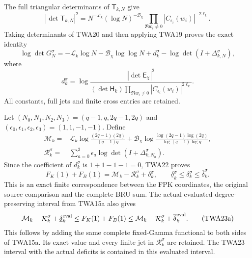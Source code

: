 \documentclass[11pt,a4paper]{article}
\begin{document}
The full triangular determinants of $\mathsf T_{k,N}$ give
\[
|\det\mathsf T_{k,N}|^2
=N^{-\mathcal L_k}(\log N)^{-\mathcal B_\chi}
 \prod_{\Re w_i\ne0}|C_{\epsilon_i}(w_i)|^{-2\ell_k}.
\]
Taking determinants of TWA20 and then applying TWA19 proves
the exact identity
\[
\log\det G_N^\sigma
=-\mathcal L_k\log N-\mathcal B_\chi\log\log N
 +d_k^\sigma-\log\det(I+\Delta_{k,N}^\sigma),
\tag{TWA22}
\]
where
\[
d_k^\sigma=\log\frac{|\det\mathsf E_\chi|^2}
{(\det\mathsf H_k)
 \prod_{\Re w_i\ne0}|C_{\epsilon_i}(w_i)|^{2\ell_k}}.
\]
All constants, full jets and finite cross entries are retained.

Let $(N_0,N_1,N_2,N_3)=(q-1,q,2q-1,2q)$ and
$(\epsilon_0,\epsilon_1,\epsilon_2,\epsilon_3)=(1,1,-1,-1)$.
Define
\[
\begin{aligned}
\mathcal M_k={}&\mathcal L_k
 \log\frac{(2q-1)(2q)}{(q-1)q}
 +\mathcal B_\chi
 \log\frac{\log(2q-1)\log(2q)}{\log(q-1)\log q},\\
\mathcal R_k^\sigma={}&\sum_{a=0}^3\epsilon_a
                         \log\det(I+\Delta_{k,N_a}^\sigma).
\end{aligned}
\]
Since the coefficient of $d_k^\sigma$ is $1+1-1-1=0$,
TWA22 proves
\[
\boxed{F_K(1)+F_B(1)
=\mathcal M_k-\mathcal R_k^\sigma+\delta_k^\sigma,
\qquad
\underline\delta_k^\sigma\leq\delta_k^\sigma
                         \leq\overline\delta_k^\sigma.}
\tag{TWA23}
\]
This is an exact finite correspondence between the FPK coordinates,
the original source comparison and the complete BRU sum. The actual
evaluated degree-preserving interval from TWA15a also gives
\[
 \mathcal M_k-\mathcal R_k^\sigma+\underline\delta_k^{\rm eval}
 \leq F_K(1)+F_B(1)
 \leq\mathcal M_k-\mathcal R_k^\sigma+\overline\delta_k^{\rm eval}.
 \tag{TWA23a}
\]
This follows by adding the same complete fixed-Gamma functional
to both sides of TWA15a. Its exact value and every finite jet
in $\mathcal R_k^\sigma$ are retained. The TWA23 interval with
the actual deficits is contained in this evaluated interval.
\end{document}
